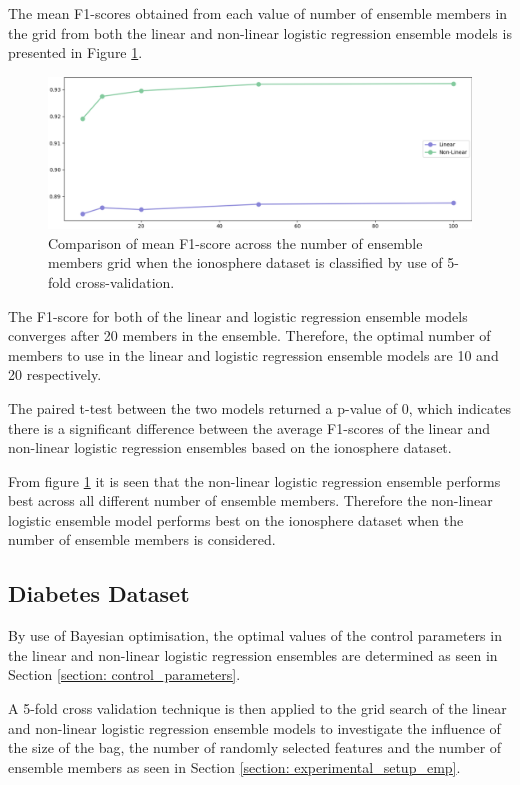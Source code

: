 \documentclass[10pt, conference]{IEEEtran}
\begin{document}
The mean F1-scores obtained from each value of number of ensemble members in the grid from both the linear and non-linear
logistic regression ensemble models is presented in Figure \ref{fig:I_member_comparison}.
\begin{figure}[H]
    \centerline{\includegraphics[scale=0.26]{../Images/I_members.PNG}}
    \caption{Comparison of mean F1-score across the number of ensemble members grid when the ionosphere dataset is classified by use of 5-fold cross-validation.}
    \label{fig:I_member_comparison}
\end{figure}
The F1-score for both of the linear and logistic regression ensemble models converges after 20 members in the ensemble. Therefore,
the optimal number of members to use in the linear and logistic regression ensemble models are 10 and 20 respectively.

The paired t-test between the two models returned a p-value of 0, which indicates there is a significant difference
between the average F1-scores of the linear and non-linear logistic regression ensembles based on the ionosphere dataset.

From figure \ref{fig:I_member_comparison} it is seen that the non-linear logistic regression ensemble performs best across
all different number of ensemble members. Therefore the non-linear logistic ensemble model performs best on the ionosphere dataset when the
number of ensemble members is considered.

\subsection{Diabetes Dataset}

By use of Bayesian optimisation, the optimal values of the control parameters in the
linear and non-linear logistic regression ensembles are determined as seen in
Section \ref{section: control_parameters}.

A 5-fold cross validation technique is then applied to the grid search of the linear and non-linear logistic regression ensemble models
to investigate the influence of the size of the bag, the number of randomly selected features and
the number of ensemble members as seen in Section \ref{section: experimental_setup_emp}.
\end{document}
